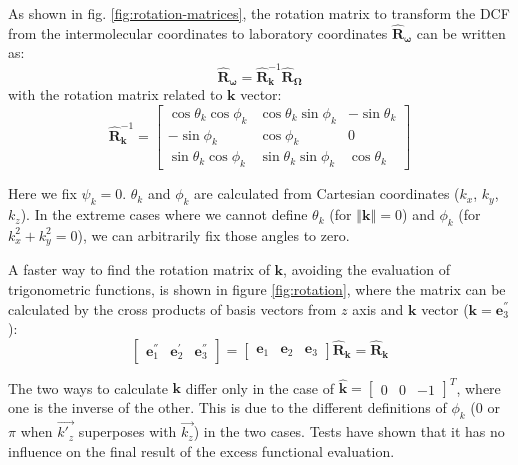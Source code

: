 As shown in fig. \ref{fig:rotation-matrices}, the rotation matrix
to transform the \acs{DCF} from the intermolecular coordinates to
laboratory coordinates $\mathbf{\hat{R}}_{\boldsymbol{\omega}}$ can
be written as:
\begin{equation}
\mathbf{\hat{R}}_{\boldsymbol{\omega}}=\mathbf{\hat{R}}_{\mathbf{k}}^{-1}\mathbf{\hat{R}}_{\mathbf{\Omega}}\label{eq:rot-matrix}
\end{equation}
with the rotation matrix related to $\mathbf{k}$ vector:
\begin{equation}
\mathbf{\hat{R}}_{\mathbf{k}}^{-1}=\left[\begin{array}{ccc}
\cos\theta_{k}\cos\phi_{k} & \cos\theta_{k}\sin\phi_{k} & -\sin\theta_{k}\\
-\sin\phi_{k} & \cos\phi_{k} & 0\\
\sin\theta_{k}\cos\phi_{k} & \sin\theta_{k}\sin\phi_{k} & \cos\theta_{k}
\end{array}\right]
\end{equation}

Here we fix $\psi_{k}=0$. $\theta_{k}$ and $\phi_{k}$ are calculated
from Cartesian coordinates ($k_{x}$, $k_{y}$, $k_{z}$). In the
extreme cases where we cannot define $\theta_{k}$ (for $\left\Vert \mathbf{k}\right\Vert =0$)
and $\phi_{k}$ (for $k_{x}^{2}+k_{y}^{2}=0$), we can arbitrarily
fix those angles to zero.

A faster way to find the rotation matrix of $\mathbf{k}$, avoiding
the evaluation of trigonometric functions, is shown in figure \ref{fig:rotation},
where the matrix can be calculated by the cross products of basis
vectors from $z$ axis and $\mathbf{k}$ vector ($\mathbf{k}=\mathbf{e}_{3}^{''}$):
\begin{equation}
\left[\begin{array}{ccc}
\mathbf{e}_{1}^{''} & \mathbf{e}_{2}^{'} & \mathbf{e}_{3}^{''}\end{array}\right]=\left[\begin{array}{ccc}
\mathbf{e}_{1} & \mathbf{e}_{2} & \mathbf{e}_{3}\end{array}\right]\mathbf{\hat{R}_{k}}=\mathbf{\hat{R}_{k}}
\end{equation}

The two ways to calculate $\mathbf{k}$ differ only in the case of
$\hat{\mathbf{k}}=\left[\begin{array}{ccc}
0 & 0 & -1\end{array}\right]^{T}$, where one is the inverse of the other. This is due to the different
definitions of $\phi_{k}$ ($0$ or $\pi$ when $\overrightarrow{k'_{z}}$
superposes with $\overrightarrow{k_{z}}$) in the two cases. Tests
have shown that it has no influence on the final result of the excess
functional evaluation.

